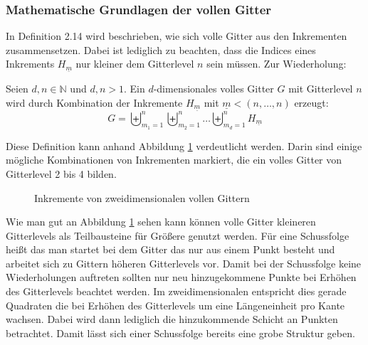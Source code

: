 \documentclass[a4paper,12pt]{llncs}
\numberwithin{equation}{section}
\begin{document}
\subsubsection{Mathematische Grundlagen der vollen Gitter}

In \cite{M13} Definition 2.14 wird beschrieben, wie sich volle Gitter aus den Inkrementen zusammensetzen. Dabei ist lediglich zu beachten, dass die Indices eines Inkrements $H_{\underline{m}}$ nur kleiner dem Gitterlevel $n$ sein müssen.  Zur Wiederholung:

\begin{definition}
	Seien $d,n\in\mathbb{N}$ und $d,n>1$. Ein $d$-dimensionales volles Gitter $G$ mit Gitterlevel $n$ wird durch Kombination der Inkremente $H_{\underline{m}}$ mit $\underline{m}<(n,\dots,n)$ erzeugt:
	\begin{equation}
		G=\biguplus_{m_1=1}^n\biguplus_{m_2=1}^n\dots \biguplus_{m_d=1}^n H_{\underline{m}}
	\end{equation}
\end{definition}

Diese Definition kann anhand Abbildung \ref{fig:gitter02} verdeutlicht werden. Darin sind einige mögliche Kombinationen von Inkrementen markiert, die ein volles Gitter von Gitterlevel 2 bis 4 bilden.

\begin{figure}
	\caption{Inkremente von zweidimensionalen vollen Gittern}
	\label{fig:gitter02}
\end{figure}

Wie man gut an Abbildung \ref{fig:gitter02} sehen kann können volle Gitter kleineren Gitterlevels als Teilbausteine für Größere genutzt werden. Für eine Schussfolge heißt das man startet bei dem Gitter das nur aus einem Punkt besteht und arbeitet sich zu Gittern höheren Gitterlevels vor. Damit bei der Schussfolge keine Wiederholungen auftreten sollten nur neu hinzugekommene Punkte bei Erhöhen des Gitterlevels beachtet werden. Im zweidimensionalen entspricht dies gerade Quadraten die bei Erhöhen des Gitterlevels um eine Längeneinheit pro Kante wachsen. Dabei wird dann lediglich die hinzukommende Schicht an Punkten betrachtet. Damit lässt sich einer Schussfolge bereits eine grobe Struktur geben. 
\end{document}
